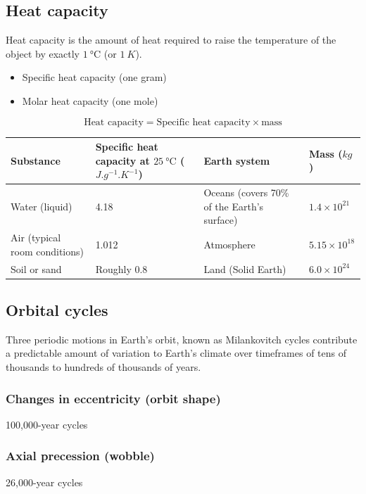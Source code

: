 \documentclass[11pt]{article}
\begin{document}
\subsection{Heat capacity}
\label{sec:org20eef40}
Heat capacity is the amount of heat required to raise the temperature of the object by exactly \(\qty{1}{\degreeCelsius}\) (or \(\qty{1}{K}\)).

\begin{itemize}
\item Specific heat capacity (one gram)
\item Molar heat capacity (one mole)
\end{itemize}

\[\text{Heat capacity} = \text{Specific heat capacity} \times \text{mass}\]

\begin{center}
\begin{tabular}{|m{8em}|m{10em}|m{10em}|m{5em}|}
\hline
Substance & Specific heat capacity at \(\qty{25}{\degreeCelsius}\) (\(\unit{J.g^{-1}.K^{-1}}\)) & Earth system & Mass (\(\unit{kg}\))\\[0pt]
\hline
Water (liquid) & 4.18 & Oceans (covers 70\% of the Earth's surface) & \(1.4 \times 10^{21}\)\\[0pt]
\hline
Air (typical room conditions) & 1.012 & Atmosphere & \(5.15 \times 10^{18}\)\\[0pt]
\hline
Soil or sand & Roughly 0.8 & Land (Solid Earth) & \(6.0 \times 10^{24}\)\\[0pt]
\hline
\end{tabular}
\end{center}

\newpage

\subsection{Orbital cycles}
\label{sec:org14b5f87}
Three periodic motions in Earth's orbit, known as Milankovitch cycles contribute a predictable amount of variation to Earth's climate over timeframes of tens of thousands to hundreds of thousands of years.

\subsubsection{Changes in eccentricity (orbit shape)}
\label{sec:org405b9a5}
100,000-year cycles

\subsubsection{Axial precession (wobble)}
\label{sec:org8ed10dc}
26,000-year cycles
\end{document}
